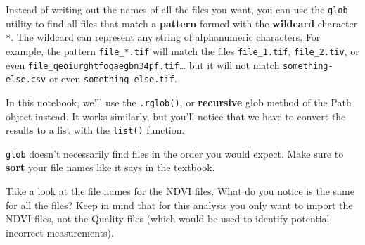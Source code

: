 \documentclass[
  letterpaper,
  DIV=11,
  numbers=noendperiod,
  oneside]{scrreprt}
\begin{document}
Instead of writing out the names of all the files you want, you can use
the \texttt{glob} utility to find all files that match a
\textbf{pattern} formed with the \textbf{wildcard} character \texttt{*}.
The wildcard can represent any string of alphanumeric characters. For
example, the pattern
\texttt{\textquotesingle{}file\_*.tif\textquotesingle{}} will match the
files \texttt{\textquotesingle{}file\_1.tif\textquotesingle{}},
\texttt{\textquotesingle{}file\_2.tiv\textquotesingle{}}, or even
\texttt{\textquotesingle{}file\_qeoiurghtfoqaegbn34pf.tif\textquotesingle{}}\ldots{}
but it will not match
\texttt{\textquotesingle{}something-else.csv\textquotesingle{}} or even
\texttt{\textquotesingle{}something-else.tif\textquotesingle{}}.

In this notebook, we'll use the \texttt{.rglob()}, or \textbf{recursive}
glob method of the Path object instead. It works similarly, but you'll
notice that we have to convert the results to a list with the
\texttt{list()} function.

\begin{tcolorbox}[enhanced jigsaw, colbacktitle=quarto-callout-caution-color!10!white, opacityback=0, bottomtitle=1mm, toptitle=1mm, bottomrule=.15mm, left=2mm, colframe=quarto-callout-caution-color-frame, leftrule=.75mm, opacitybacktitle=0.6, colback=white, rightrule=.15mm, toprule=.15mm, breakable, titlerule=0mm, title=\textcolor{quarto-callout-caution-color}{\faFire}\hspace{0.5em}{GOTCHA ALERT!}, coltitle=black, arc=.35mm]

\texttt{glob} doesn't necessarily find files in the order you would
expect. Make sure to \textbf{sort} your file names like it says in the
textbook.

\end{tcolorbox}

\begin{tcolorbox}[enhanced jigsaw, colbacktitle=quarto-callout-color!10!white, opacityback=0, bottomtitle=1mm, toptitle=1mm, bottomrule=.15mm, left=2mm, colframe=quarto-callout-color-frame, leftrule=.75mm, opacitybacktitle=0.6, colback=white, rightrule=.15mm, toprule=.15mm, breakable, titlerule=0mm, title=\textcolor{quarto-callout-color}{\faInfo}\hspace{0.5em}{Reflect and Respond}, coltitle=black, arc=.35mm]

Take a look at the file names for the NDVI files. What do you notice is
the same for all the files? Keep in mind that for this analysis you only
want to import the NDVI files, not the Quality files (which would be
used to identify potential incorrect measurements).

\end{tcolorbox}
\end{document}
